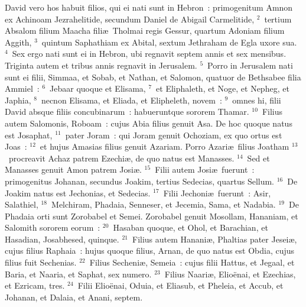 \bchapter
\lettrine[lines=3,image=true,loversize=0.05,lraise=-0.03]{D}{}avid vero hos habuit filios, qui ei nati sunt in Hebron~: primogenitum Amnon ex Achinoam Jezrahelitide, secundum Daniel de Abigail Carmelitide,
${}^{2}$~tertium Absalom filium Maacha fili\ae\ Tholmai regis Gessur, quartum Adoniam filium Aggith,
${}^{3}$~quintum Saphathiam ex Abital, sextum Jethraham de Egla uxore sua.
${}^{4}$~Sex ergo nati sunt ei in Hebron, ubi regnavit septem annis et sex mensibus. Triginta autem et tribus annis regnavit in Jerusalem.
${}^{5}$~Porro in Jerusalem nati sunt ei filii, Simmaa, et Sobab, et Nathan, et Salomon, quatuor de Bethsabee filia Ammiel~:
${}^{6}$~Jebaar quoque et Elisama,
${}^{7}$~et Eliphaleth, et Noge, et Nepheg, et Japhia,
${}^{8}$~necnon Elisama, et Eliada, et Elipheleth, novem~:
${}^{9}$~omnes hi, filii David absque filiis concubinarum~: habueruntque sororem Thamar.
${}^{10}$~Filius autem Salomonis, Roboam~: cujus Abia filius genuit Asa. De hoc quoque natus est Josaphat,
${}^{11}$~pater Joram~: qui Joram genuit Ochoziam, ex quo ortus est Joas~:
${}^{12}$~et hujus Amasias filius genuit Azariam. Porro Azari\ae\ filius Joatham
${}^{13}$~procreavit Achaz patrem Ezechi\ae , de quo natus est Manasses.
${}^{14}$~Sed et Manasses genuit Amon patrem Josi\ae .
${}^{15}$~Filii autem Josi\ae\ fuerunt~: primogenitus Johanan, secundus Joakim, tertius Sedecias, quartus Sellum.
${}^{16}$~De Joakim natus est Jechonias, et Sedecias.
${}^{17}$~Filii Jechoni\ae\ fuerunt~: Asir, Salathiel,
${}^{18}$~Melchiram, Phadaia, Senneser, et Jecemia, Sama, et Nadabia.
${}^{19}$~De Phadaia orti sunt Zorobabel et Semei. Zorobabel genuit Mosollam, Hananiam, et Salomith sororem eorum~:
${}^{20}$~Hasaban quoque, et Ohol, et Barachian, et Hasadian, Josabhesed, quinque.
${}^{21}$~Filius autem Hanani\ae , Phaltias pater Jesei\ae , cujus filius Raphaia~: hujus quoque filius, Arnan, de quo natus est Obdia, cujus filius fuit Sechenias.
${}^{22}$~Filius Secheni\ae , Semeia~: cujus filii Hattus, et Jegaal, et Baria, et Naaria, et Saphat, sex numero.
${}^{23}$~Filius Naari\ae , Elio\"enai, et Ezechias, et Ezricam, tres.
${}^{24}$~Filii Elio\"enai, Oduia, et Eliasub, et Pheleia, et Accub, et Johanan, et Dalaia, et Anani, septem.

